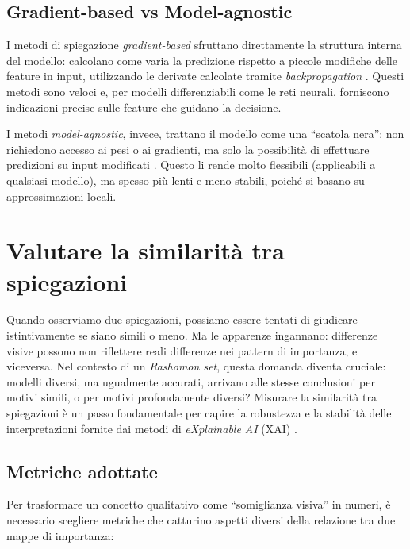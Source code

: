 \documentclass[12pt,a4paper,oneside]{report}
\numberwithin{figure}{chapter}
\numberwithin{table}{chapter}
\begin{document}
\section{Gradient-based vs Model-agnostic} \label{sec:gradient_vs_model}
I metodi di spiegazione \emph{gradient-based} sfruttano direttamente la
struttura interna del modello: calcolano come varia la predizione rispetto a
piccole modifiche delle feature in input, utilizzando le derivate calcolate
tramite \emph{backpropagation}
\citep{simonyan2014deep,sundararajan2017axiomatic}. Questi metodi sono veloci
e, per modelli differenziabili come le reti neurali, forniscono indicazioni
precise sulle feature che guidano la decisione.

I metodi \emph{model-agnostic}, invece, trattano il modello come una “scatola
nera”: non richiedono accesso ai pesi o ai gradienti, ma solo la possibilità di
effettuare predizioni su input modificati
\citep{ribeiro2016lime,guidotti2018survey}. Questo li rende molto flessibili
(applicabili a qualsiasi modello), ma spesso più lenti e meno stabili, poiché
si basano su approssimazioni locali.

\chapter{Valutare la similarità tra spiegazioni}

Quando osserviamo due spiegazioni, possiamo essere tentati di giudicare
istintivamente se siano simili o meno. Ma le apparenze ingannano: differenze
visive possono non riflettere reali differenze nei pattern di importanza, e
viceversa. Nel contesto di un \emph{Rashomon set}, questa domanda diventa
cruciale: modelli diversi, ma ugualmente accurati, arrivano alle stesse
conclusioni per motivi simili, o per motivi profondamente diversi? Misurare la
similarità tra spiegazioni è un passo fondamentale per capire la robustezza e
la stabilità delle interpretazioni fornite dai metodi di \emph{eXplainable AI}
(XAI) \citep{samek2016evaluating, mueller2023rashomon}.

\section{Metriche adottate}
Per trasformare un concetto qualitativo come ``somiglianza visiva'' in numeri,
è necessario scegliere metriche che catturino aspetti diversi della relazione
tra due mappe di importanza:
\end{document}

